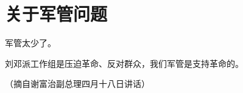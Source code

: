 \section[关于军管问题（一九六七年四月）]{关于军管问题}


军管太少了。

刘邓派工作组是压迫革命、反对群众，我们军管是支持革命的。

{\raggedleft （摘自谢富治副总理四月十八日讲话）\par}


